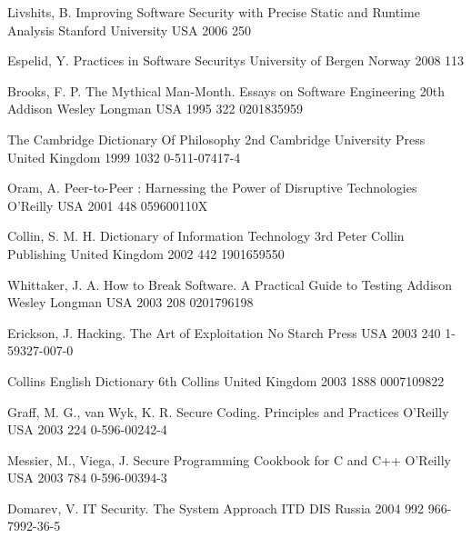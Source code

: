 \begin{thebibliography}{9}
		{Livshits, B.} %
		{Improving Software Security with Precise Static and Runtime Analysis}
		{Stanford University}
		{USA}
		{2006}
		{250}
	
		{Espelid, Y.} %
		{Practices in Software Securitys}
		{University of Bergen}
		{Norway}
		{2008}
		{113}


		{Brooks, F. P.} %
		{The Mythical Man-Month. Essays on Software Engineering}
		{20th}
		{Addison Wesley Longman}
		{USA}
		{1995}
		{322}
		{0201835959}
	
		{}
		{The {C}ambridge {D}ictionary Of {P}hilosophy}
		{2nd}
		{Cambridge University Press}
		{United Kingdom}
		{1999}
		{1032}
		{0-511-07417-4}
	
		{Oram, A.} %
		{Peer-to-Peer : Harnessing the Power of Disruptive Technologies}
		{}
		{O'Reilly}
		{USA}
		{2001}
		{448}
		{059600110X}
		
		{Collin, S. M. H.} %
		{Dictionary of {I}nformation {T}echnology}
		{3rd}
		{Peter Collin Publishing}
		{United Kingdom}
		{2002}
		{442}
		{1901659550}
		
		{Whittaker, J. A.} %
		{How to Break Software. A Practical Guide to Testing}
		{}
		{Addison Wesley Longman}
		{USA}
		{2003}
		{208}
		{0201796198}
	
		{Erickson, J.} %
		{Hacking. The Art of Exploitation}
		{}
		{No Starch Press}
		{USA}
		{2003}
		{240}
		{1-59327-007-0}
	
		{}
		{Collins {E}nglish {D}ictionary}
		{6th}
		{Collins}
		{United Kingdom}
		{2003}
		{1888}
		{0007109822}
	
		{Graff, M. G., van Wyk, K. R.} %
		{Secure Coding. Principles and Practices}
		{}
		{O'Reilly}
		{USA}
		{2003}
		{224}
		{0-596-00242-4}
	
		{Messier, M., Viega, J.} %
		{Secure Programming Cookbook for {C} and {C++}}
		{}
		{O'Reilly}
		{USA}
		{2003}
		{784}
		{0-596-00394-3}
	
		{Domarev, V.} %
		{{IT} Security. The System Approach}
		{}
		{ITD DIS}
		{Russia}
		{2004}
		{992}
		{966-7992-36-5}
	

\end{thebibliography}
